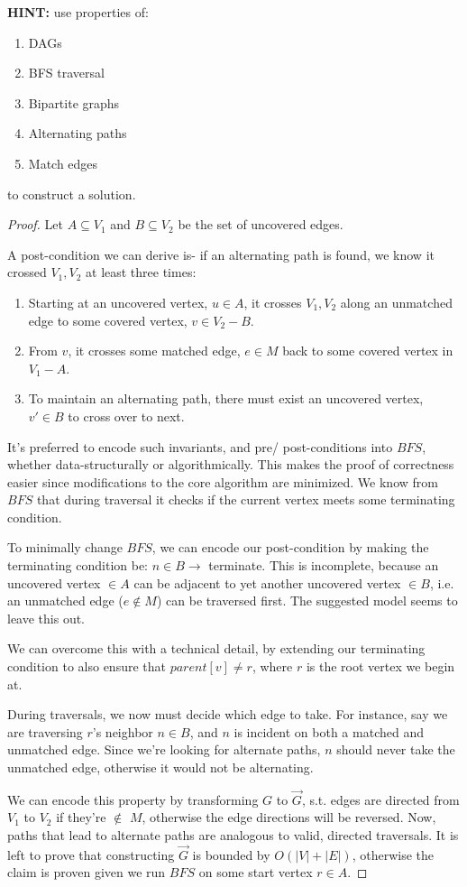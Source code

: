 \documentclass{article}
\theoremstyle{definition}
\begin{document}
\textbf{HINT:} use properties of:
\begin{enumerate}
	\item DAGs
	\item BFS traversal
	\item Bipartite graphs
	\item Alternating paths
	\item Match edges
\end{enumerate}
to construct a solution.

\begin{proof}
	 Let $A \subseteq V_1$ and $B \subseteq V_2$  be the set of uncovered edges.
	
	A post-condition we can derive is- if an alternating path is found, we know it crossed $V_1, V_2$ at least three times:
	\begin{enumerate}
		\item Starting at an uncovered vertex, $u \in A$, it crosses $V_1, V_2$ along an unmatched edge to some covered vertex, $v \in V_2 - B$.
		\item From $v$, it crosses some matched edge, $e \in M$ back to some covered vertex in $V_1-A$.
		\item To maintain an alternating path, there must exist an uncovered vertex, $v' \in B$ to cross over to next.
	\end{enumerate}
	
	It's preferred to encode such invariants, and pre/ post-conditions into $BFS$, whether data-structurally or algorithmically. This makes the proof of correctness easier since modifications to the core algorithm are minimized. We know from \hyperref[alg:bfs]{$BFS$} that during traversal it checks if the current vertex meets some terminating condition.
	
	To minimally change $BFS$, we can encode our post-condition by making the terminating condition be: $n \in B \to$ terminate. This is incomplete, because an uncovered vertex $\in A$ can be adjacent to yet another uncovered vertex $\in B$, i.e. an unmatched edge ($e \notin M$) can be traversed first. The suggested model seems to leave this out. 
	
	We can overcome this with a technical detail, by extending our terminating condition to also ensure that $parent[v] \neq r$, where $r$ is the root vertex we begin at. 
	
	During traversals, we now must decide which edge to take. For instance, say we are traversing $r$'s neighbor $n \in B$, and $n$ is incident on both a matched and unmatched edge. Since we're looking for alternate paths, $n$ should never take the unmatched edge, otherwise it would not be alternating.
	
	We can encode this property by transforming $G$ to $\overrightarrow{G}$, s.t. edges are directed from $V_1$ to $V_2$ if they're \textbf{$\notin$} $M$, otherwise the edge directions will be reversed. Now, paths that lead to alternate paths are analogous to valid, directed traversals. It is left to prove that constructing $\overrightarrow{G}$ is bounded by $O(|V|+|E|)$, otherwise the claim is proven given we run $BFS$ on some start vertex $r \in A$.
\end{proof}
\end{document}
